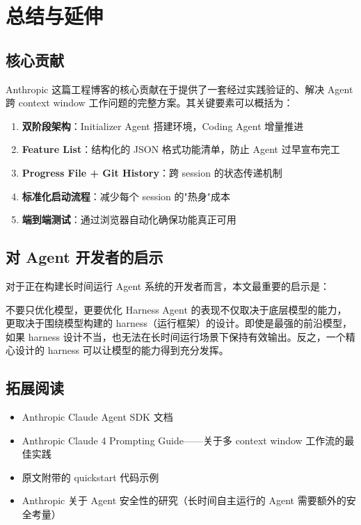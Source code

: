 \section{总结与延伸}

\subsection{核心贡献}

Anthropic 这篇工程博客的核心贡献在于提供了一套经过实践验证的、解决 Agent 跨 context window 工作问题的完整方案。其关键要素可以概括为：

\begin{enumerate}
    \item \textbf{双阶段架构}：Initializer Agent 搭建环境，Coding Agent 增量推进
    \item \textbf{Feature List}：结构化的 JSON 格式功能清单，防止 Agent 过早宣布完工
    \item \textbf{Progress File + Git History}：跨 session 的状态传递机制
    \item \textbf{标准化启动流程}：减少每个 session 的"热身"成本
    \item \textbf{端到端测试}：通过浏览器自动化确保功能真正可用
\end{enumerate}

\subsection{对 Agent 开发者的启示}

对于正在构建长时间运行 Agent 系统的开发者而言，本文最重要的启示是：

\begin{importantbox}{不要只优化模型，更要优化 Harness}
Agent 的表现不仅取决于底层模型的能力，更取决于围绕模型构建的 harness（运行框架）的设计。即使是最强的前沿模型，如果 harness 设计不当，也无法在长时间运行场景下保持有效输出。反之，一个精心设计的 harness 可以让模型的能力得到充分发挥。
\end{importantbox}

\subsection{拓展阅读}

\begin{itemize}
    \item Anthropic Claude Agent SDK 文档
    \item Anthropic Claude 4 Prompting Guide——关于多 context window 工作流的最佳实践
    \item 原文附带的 quickstart 代码示例
    \item Anthropic 关于 Agent 安全性的研究（长时间自主运行的 Agent 需要额外的安全考量）
\end{itemize}



